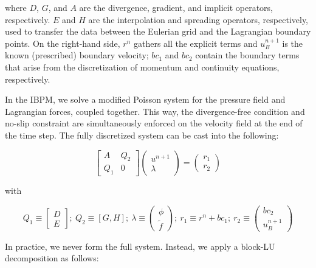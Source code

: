 where $D$, $G$, and $A$ are the divergence, gradient, and implicit operators, respectively.
$E$ and $H$ are the interpolation and spreading operators, respectively, used to transfer the data between the Eulerian grid and the Lagrangian boundary points.
On the right-hand side, $r^n$ gathers all the explicit terms and $u_B^{n+1}$ is the known (prescribed) boundary velocity; $bc_1$ and $bc_2$ contain the boundary terms that arise from the discretization of momentum and continuity equations, respectively.

In the IBPM, we solve a modified Poisson system for the pressure field and Lagrangian forces, coupled together.
This way, the divergence-free condition and no-slip constraint are simultaneously enforced on the velocity field at the end of the time step.
The fully discretized system can be cast into the following:

\begin{equation}
\left[
\begin{matrix}
A & Q_2 \\
Q_1 & 0
\end{matrix}
\right]
\left(
\begin{matrix}
u^{n+1} \\
\lambda
\end{matrix}
\right)
=
\left(
\begin{matrix}
r_1 \\
r_2
\end{matrix}
\right)
\end{equation}

with

\begin{equation*}
Q_1 \equiv \left[ \begin{matrix} D \\ E \end{matrix} \right] ;\
Q_2 \equiv \left[ G, H \right] ;\
\lambda \equiv \left( \begin{matrix} \phi \\ \tilde{f} \end{matrix} \right) ;\
r_1 \equiv r^n + bc_1 ;\
r_2 \equiv \left( \begin{matrix} bc_2 \\ u_B^{n+1} \end{matrix} \right)
\end{equation*}

In practice, we never form the full system.
Instead, we apply a block-LU decomposition as follows:

